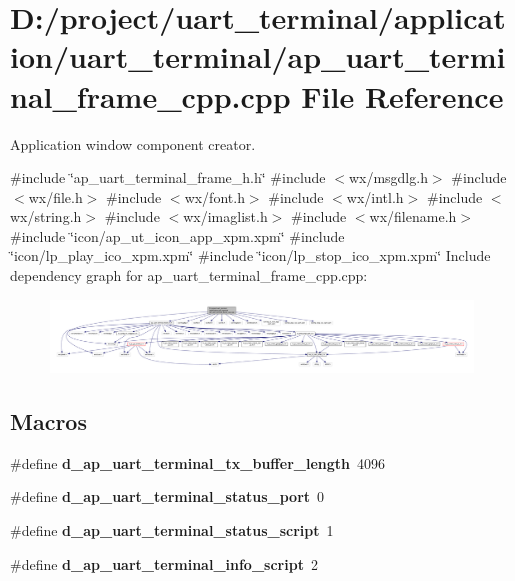 \section{D\+:/project/uart\+\_\+terminal/application/uart\+\_\+terminal/ap\+\_\+uart\+\_\+terminal\+\_\+frame\+\_\+cpp.cpp File Reference}
\label{ap__uart__terminal__frame__cpp_8cpp}


Application window component creator.  


{\ttfamily \#include \char`\"{}ap\+\_\+uart\+\_\+terminal\+\_\+frame\+\_\+h.\+h\char`\"{}}\newline
{\ttfamily \#include $<$wx/msgdlg.\+h$>$}\newline
{\ttfamily \#include $<$wx/file.\+h$>$}\newline
{\ttfamily \#include $<$wx/font.\+h$>$}\newline
{\ttfamily \#include $<$wx/intl.\+h$>$}\newline
{\ttfamily \#include $<$wx/string.\+h$>$}\newline
{\ttfamily \#include $<$wx/imaglist.\+h$>$}\newline
{\ttfamily \#include $<$wx/filename.\+h$>$}\newline
{\ttfamily \#include \char`\"{}icon/ap\+\_\+ut\+\_\+icon\+\_\+app\+\_\+xpm.\+xpm\char`\"{}}\newline
{\ttfamily \#include \char`\"{}icon/lp\+\_\+play\+\_\+ico\+\_\+xpm.\+xpm\char`\"{}}\newline
{\ttfamily \#include \char`\"{}icon/lp\+\_\+stop\+\_\+ico\+\_\+xpm.\+xpm\char`\"{}}\newline
Include dependency graph for ap\+\_\+uart\+\_\+terminal\+\_\+frame\+\_\+cpp.\+cpp\+:
\nopagebreak
\begin{figure}[H]
\begin{center}
\leavevmode
\includegraphics[width=350pt]{ap__uart__terminal__frame__cpp_8cpp__incl}
\end{center}
\end{figure}
\subsection*{Macros}
\begin{DoxyCompactItemize}
\item 
\#define \textbf{ d\+\_\+ap\+\_\+uart\+\_\+terminal\+\_\+tx\+\_\+buffer\+\_\+length}~4096
\item 
\#define {\bfseries d\+\_\+ap\+\_\+uart\+\_\+terminal\+\_\+status\+\_\+port}~0
\item 
\#define {\bfseries d\+\_\+ap\+\_\+uart\+\_\+terminal\+\_\+status\+\_\+script}~1
\item 
\#define {\bfseries d\+\_\+ap\+\_\+uart\+\_\+terminal\+\_\+info\+\_\+script}~2
\end{DoxyCompactItemize}


